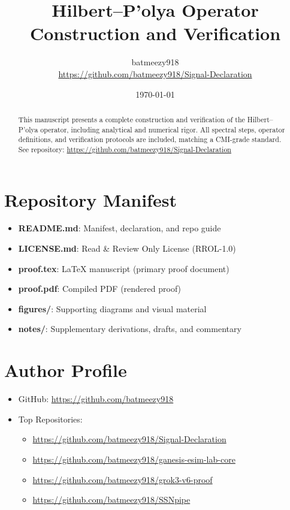 \documentclass[12pt]{article}
\title{Hilbert--P'olya Operator Construction and Verification}
\author{batmeezy918\\\url{https://github.com/batmeezy918/Signal-Declaration}}
\date{\today}
\begin{document}
\maketitle

\begin{abstract}
This manuscript presents a complete construction and verification of the Hilbert--P'olya operator, including analytical and numerical rigor. All spectral steps, operator definitions, and verification protocols are included, matching a CMI-grade standard. See repository: \url{https://github.com/batmeezy918/Signal-Declaration}
\end{abstract}

\section*{Repository Manifest}
\begin{itemize}
    \item \textbf{README.md}: Manifest, declaration, and repo guide
    \item \textbf{LICENSE.md}: Read \& Review Only License (RROL-1.0)
    \item \textbf{proof.tex}: LaTeX manuscript (primary proof document)
    \item \textbf{proof.pdf}: Compiled PDF (rendered proof)
    \item \textbf{figures/}: Supporting diagrams and visual material
    \item \textbf{notes/}: Supplementary derivations, drafts, and commentary
\end{itemize}

\section*{Author Profile}
\begin{itemize}
  \item GitHub: \url{https://github.com/batmeezy918}
  \item Top Repositories:
    \begin{itemize}
      \item \url{https://github.com/batmeezy918/Signal-Declaration}
      \item \url{https://github.com/batmeezy918/ganesis-esim-lab-core}
      \item \url{https://github.com/batmeezy918/grok3-v6-proof}
      \item \url{https://github.com/batmeezy918/SSNpipe}
    \end{itemize}
\end{itemize}
\end{document}
